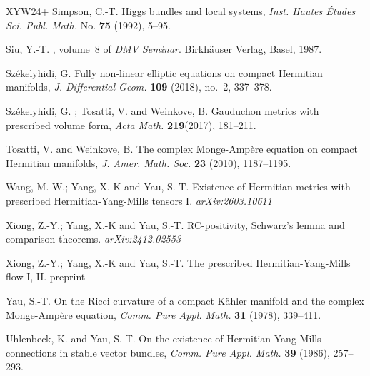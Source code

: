 \documentclass[12pt, reqno]{amsart}
\theoremstyle{plain}
\theoremstyle{definition}
\renewcommand{\>}{\rightarrow}
\renewcommand{\>}{\rightarrow}
\numberwithin{equation}{section} %
\begin{document}
\begin{thebibliography}{XYW24+}
     Simpson, C.-T.  Higgs bundles and local systems,  \emph{Inst. Hautes \'Etudes Sci. Publ. Math.} No. \textbf{75} (1992), 5--95.





    Siu, Y.-T.
    , volume~8 of {\em DMV Seminar}.
    \newblock Birkh\"auser Verlag, Basel, 1987.





Sz\'ekelyhidi, G. Fully non-linear elliptic equations on compact
Hermitian manifolds, \emph{J. Differential Geom.} {\bf 109} (2018),
no.~2, 337--378.

Sz\'ekelyhidi, G. ; Tosatti, V. and Weinkove, B. Gauduchon metrics with prescribed volume form,  \emph{Acta Math.} \textbf{219}(2017), 181--211.

     Tosatti, V.  and Weinkove, B.  The complex Monge-Amp\`ere equation on compact Hermitian manifolds, \emph{J. Amer. Math. Soc.} \textbf{23} (2010), 1187--1195.

     Wang, M.-W.; Yang, X.-K and Yau, S.-T. Existence of Hermitian metrics  with  prescribed Hermitian-Yang-Mills tensors  I.  \emph{arXiv:2603.10611}



     Xiong, Z.-Y.; Yang, X.-K and  Yau, S.-T.
    RC-positivity, Schwarz's lemma and comparison theorems. \emph{arXiv:2412.02553}

     Xiong, Z.-Y.; Yang, X.-K and  Yau, S.-T. The prescribed Hermitian-Yang-Mills flow I,  II. preprint








    Yau, S.-T.  On the Ricci curvature of a compact K\"ahler manifold and the complex Monge-Amp\`ere equation, \emph{Comm. Pure Appl. Math.} \textbf{31} (1978), 339--411.



    Uhlenbeck, K. and Yau, S.-T.  On the existence of Hermitian-Yang-Mills connections in stable vector bundles, \emph{Comm. Pure Appl. Math.} \textbf{39} (1986), 257--293.



\end{thebibliography}
\end{document}
